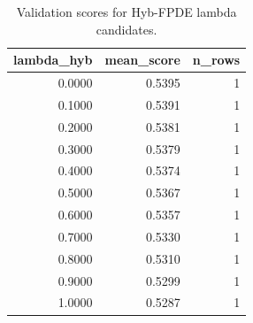 \begin{table}[t]
\caption{Validation scores for Hyb-FPDE lambda candidates.}
\label{tab:lambda_distribution_computed}
\centering
\begin{tabular}{rrr}
\toprule
lambda\_hyb & mean\_score & n\_rows \\
\midrule
0.0000 & 0.5395 & 1 \\
0.1000 & 0.5391 & 1 \\
0.2000 & 0.5381 & 1 \\
0.3000 & 0.5379 & 1 \\
0.4000 & 0.5374 & 1 \\
0.5000 & 0.5367 & 1 \\
0.6000 & 0.5357 & 1 \\
0.7000 & 0.5330 & 1 \\
0.8000 & 0.5310 & 1 \\
0.9000 & 0.5299 & 1 \\
1.0000 & 0.5287 & 1 \\
\bottomrule
\end{tabular}

\end{table}
